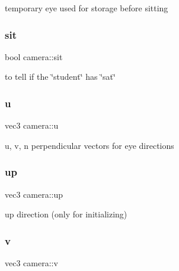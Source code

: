 temporary eye used for storage before sitting 

\hypertarget{classcamera_a7df2e3c3ed6046af3eb905462866b118}{}\label{classcamera_a7df2e3c3ed6046af3eb905462866b118} 
\subsubsection{\texorpdfstring{sit}{sit}}
{\footnotesize\ttfamily bool camera\+::sit\hspace{0.3cm}{\ttfamily [private]}}



to tell if the \char`\"{}student\char`\"{} has \char`\"{}sat\char`\"{} 

\hypertarget{classcamera_a610b4723a2dc8dbeefc815fe99116719}{}\label{classcamera_a610b4723a2dc8dbeefc815fe99116719} 
\subsubsection{\texorpdfstring{u}{u}}
{\footnotesize\ttfamily vec3 camera\+::u\hspace{0.3cm}{\ttfamily [private]}}



u, v, n perpendicular vectors for eye directions 

\hypertarget{classcamera_a1d4c89c9cc2e4be93650f3a1f94c4555}{}\label{classcamera_a1d4c89c9cc2e4be93650f3a1f94c4555} 
\subsubsection{\texorpdfstring{up}{up}}
{\footnotesize\ttfamily vec3 camera\+::up\hspace{0.3cm}{\ttfamily [private]}}



up direction (only for initializing) 

\hypertarget{classcamera_a056e047e57d62a35813f8c5d7bfa78cb}{}\label{classcamera_a056e047e57d62a35813f8c5d7bfa78cb} 
\subsubsection{\texorpdfstring{v}{v}}
{\footnotesize\ttfamily vec3 camera\+::v\hspace{0.3cm}{\ttfamily [private]}}

